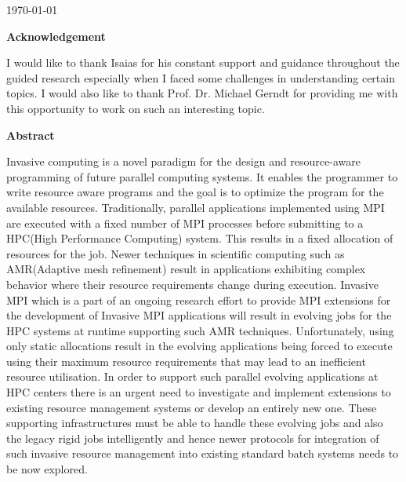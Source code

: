 \documentclass[a4paper, 12pt]{article}
\begin{document}
\begin{titlepage}


{\large \today}\\[2cm] %

\end{titlepage}

\begin{center}
\huge \bfseries Acknowledgement
\end{center}
\thispagestyle{empty}
\vspace{35mm}
I would like to thank  Isaias for his constant support and guidance throughout the guided research especially when I faced some challenges in understanding certain topics. I would also like to thank Prof. Dr. Michael Gerndt for providing me with this opportunity to work on such an interesting topic.

\newpage

\begin{center}
\huge \bfseries Abstract
\end{center}
\thispagestyle{empty}
\vspace{35mm}

Invasive computing is a novel paradigm for the design and resource-aware programming of future parallel computing systems. It enables the programmer to write resource aware programs and the goal is to optimize the program for the available resources. Traditionally, parallel applications implemented using MPI are executed with a fixed number of MPI processes before submitting to a HPC(High Performance Computing) system. This results in a fixed allocation of resources for the job. Newer techniques in scientific computing such as AMR(Adaptive mesh refinement) result in applications exhibiting complex behavior where their resource requirements change during execution. Invasive MPI which is a part of an ongoing research effort to provide MPI extensions for the development of Invasive MPI applications will result in evolving jobs for the HPC systems at runtime supporting such AMR techniques. Unfortunately, using only static allocations result in the evolving applications being forced to execute using their maximum resource requirements that may lead to an inefficient resource utilisation. In order to support such parallel evolving applications at HPC centers there is an urgent need to investigate and implement extensions to existing resource management systems or develop an entirely new one. These supporting infrastructures must be able to handle these evolving jobs and also the legacy rigid jobs intelligently and hence newer protocols for integration of such invasive resource management into existing standard batch systems needs to be now explored.
\end{document}

